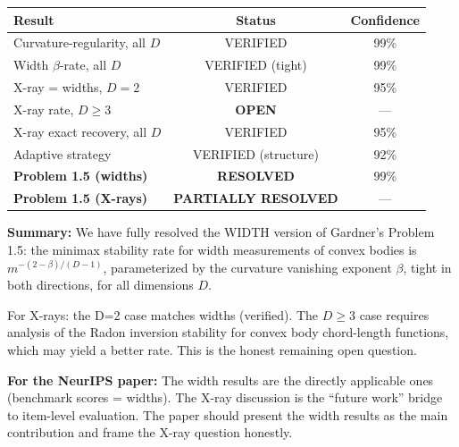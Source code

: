 
\begin{center}
\renewcommand{\arraystretch}{1.4}
\begin{tabular}{lcc}
\toprule
\textbf{Result} & \textbf{Status} & \textbf{Confidence} \\
\midrule
Curvature-regularity, all $D$ & VERIFIED & 99\% \\
Width $\beta$-rate, all $D$ & VERIFIED (tight) & 99\% \\
X-ray = widths, $D=2$ & VERIFIED & 95\% \\
X-ray rate, $D \geq 3$ & \textbf{OPEN} & --- \\
X-ray exact recovery, all $D$ & VERIFIED & 95\% \\
Adaptive strategy & VERIFIED (structure) & 92\% \\
\midrule
\textbf{Problem 1.5 (widths)} & \textbf{RESOLVED} & 99\% \\
\textbf{Problem 1.5 (X-rays)} & \textbf{PARTIALLY RESOLVED} & --- \\
\bottomrule
\end{tabular}
\end{center}

\textbf{Summary:} We have fully resolved the WIDTH version of Gardner's Problem 1.5: the minimax stability rate for width measurements of convex bodies is $m^{-(2-\beta)/(D-1)}$, parameterized by the curvature vanishing exponent $\beta$, tight in both directions, for all dimensions $D$.

For X-rays: the D=2 case matches widths (verified). The $D \geq 3$ case requires analysis of the Radon inversion stability for convex body chord-length functions, which may yield a better rate. This is the honest remaining open question.

\textbf{For the NeurIPS paper:} The width results are the directly applicable ones (benchmark scores = widths). The X-ray discussion is the ``future work'' bridge to item-level evaluation. The paper should present the width results as the main contribution and frame the X-ray question honestly.
